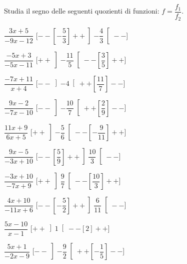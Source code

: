 \begin{esercizio}\label{ese:dis_8}
 Studia il segno delle seguenti quozienti di funzioni: 
 \(f = \dfrac {f_1}{f_2}\).
\begin{multicols}{2}
 \begin{enumeratea}
  \item  \(\dfrac{3 x +5}{-9 x -12}\) \hfill 
  [\(--\left [-\dfrac{5}{3} \right ]++\left ]-\dfrac{4}{3} \right [--\)]
  \item  \(\dfrac{-5 x +3}{-5 x -11}\) \hfill 
  [\(++\left ]-\dfrac{11}{5} \right [--\left [\dfrac{3}{5} \right ]++\)]
  \item  \(\dfrac{-7 x +11}{x +4}\) \hfill 
  [\(--\left ]-4 \right [++\left [\dfrac{11}{7} \right ]--\)]
  \item  \(\dfrac{9 x -2}{-7 x -10}\) \hfill 
  [\(--\left ]-\dfrac{10}{7} \right [++\left [\dfrac{2}{9} \right ]--\)]
  \item  \(\dfrac{11 x +9}{6 x +5}\) \hfill 
  [\(++\left ]-\dfrac{5}{6} \right [--\left [-\dfrac{9}{11} \right ]++\)]
  \item  \(\dfrac{9 x -5}{-3 x +10}\) \hfill 
  [\(--\left [\dfrac{5}{9} \right ]++\left ]\dfrac{10}{3} \right [--\)]
  \item  \(\dfrac{-3 x +10}{-7 x +9}\) \hfill 
  [\(++\left ]\dfrac{9}{7} \right [--\left [\dfrac{10}{3} \right ]++\)]
  \item  \(\dfrac{4 x +10}{-11 x +6}\) \hfill 
  [\(--\left [-\dfrac{5}{2} \right ]++\left ]\dfrac{6}{11} \right [--\)]
  \item  \(\dfrac{5 x -10}{x -1}\) \hfill 
  [\(++\left ]1 \right [--\left [2 \right ]++\)]
  \item  \(\dfrac{5 x +1}{-2 x -9}\) \hfill 
  [\(--\left ]-\dfrac{9}{2} \right [++\left [-\dfrac{1}{5} \right ]--\)]
 \end{enumeratea}
\end{multicols}
\end{esercizio}

\subsubsection*{}

